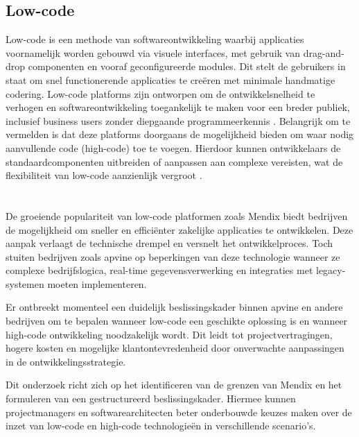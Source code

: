 \subsection{Low-code}
Low-code is een methode van softwareontwikkeling waarbij applicaties voornamelijk worden gebouwd via visuele interfaces, met gebruik van drag-and-drop componenten en vooraf geconfigureerde modules. Dit stelt de gebruikers in staat om snel functionerende applicaties te creëren met minimale handmatige codering. Low-code platforms zijn ontworpen om de ontwikkelsnelheid te verhogen en softwareontwikkeling toegankelijk te maken voor een breder publiek, inclusief business users zonder diepgaande programmeerkennis \autocite{Bunce2024}. Belangrijk om te vermelden is dat deze platforms doorgaans de mogelijkheid bieden om waar nodig aanvullende code (high-code) toe te voegen. Hierdoor kunnen ontwikkelaars de standaardcomponenten uitbreiden of aanpassen aan complexe vereisten, wat de flexibiliteit van low-code aanzienlijk vergroot \autocite{Northcutt2023}.

\section{}%
\label{sec:probleemstelling}

De groeiende populariteit van low-code platformen zoals Mendix biedt bedrijven de mogelijkheid om sneller en efficiënter zakelijke applicaties te ontwikkelen. Deze aanpak verlaagt de technische drempel en versnelt het ontwikkelproces. Toch stuiten bedrijven zoals apvine op beperkingen van deze technologie wanneer ze complexe bedrijfslogica, real-time gegevensverwerking en integraties met legacy-systemen moeten implementeren.

Er ontbreekt momenteel een duidelijk beslissingskader binnen apvine en andere bedrijven om te bepalen wanneer low-code een geschikte oplossing is en wanneer high-code ontwikkeling noodzakelijk wordt. Dit leidt tot projectvertragingen, hogere kosten en mogelijke klantontevredenheid door onverwachte aanpassingen in de ontwikkelingsstrategie.

Dit onderzoek richt zich op het identificeren van de grenzen van Mendix en het formuleren van een gestructureerd beslissingskader. Hiermee kunnen projectmanagers en softwarearchitecten beter onderbouwde keuzes maken over de inzet van low-code en high-code technologieën in verschillende scenario's.


\section{}%
\label{sec:onderzoeksvraag}

